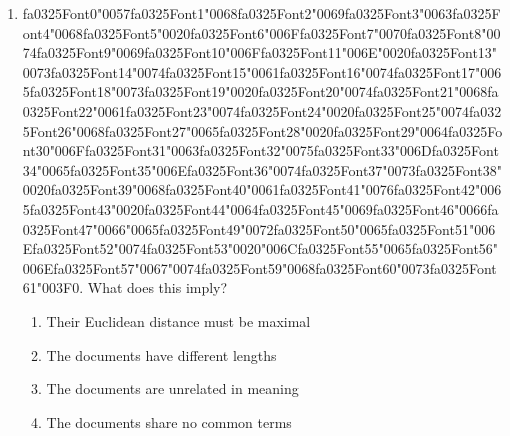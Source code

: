 \documentclass[12pt]{article}
\begin{document}
\begin{enumerate}[label=Q\arabic*.]
 \item {\csname fa0325Font0\endcsname\char"0057}{\csname fa0325Font1\endcsname\char"0068}{\csname fa0325Font2\endcsname\char"0069}{\csname fa0325Font3\endcsname\char"0063}{\csname fa0325Font4\endcsname\char"0068}{\csname fa0325Font5\endcsname\char"0020}{\csname fa0325Font6\endcsname\char"006F}{\csname fa0325Font7\endcsname\char"0070}{\csname fa0325Font8\endcsname\char"0074}{\csname fa0325Font9\endcsname\char"0069}{\csname fa0325Font10\endcsname\char"006F}{\csname fa0325Font11\endcsname\char"006E}{\char"0020}{\csname fa0325Font13\endcsname\char"0073}{\csname fa0325Font14\endcsname\char"0074}{\csname fa0325Font15\endcsname\char"0061}{\csname fa0325Font16\endcsname\char"0074}{\csname fa0325Font17\endcsname\char"0065}{\csname fa0325Font18\endcsname\char"0073}{\csname fa0325Font19\endcsname\char"0020}{\csname fa0325Font20\endcsname\char"0074}{\csname fa0325Font21\endcsname\char"0068}{\csname fa0325Font22\endcsname\char"0061}{\csname fa0325Font23\endcsname\char"0074}{\csname fa0325Font24\endcsname\char"0020}{\csname fa0325Font25\endcsname\char"0074}{\csname fa0325Font26\endcsname\char"0068}{\csname fa0325Font27\endcsname\char"0065}{\csname fa0325Font28\endcsname\char"0020}{\csname fa0325Font29\endcsname\char"0064}{\csname fa0325Font30\endcsname\char"006F}{\csname fa0325Font31\endcsname\char"0063}{\csname fa0325Font32\endcsname\char"0075}{\csname fa0325Font33\endcsname\char"006D}{\csname fa0325Font34\endcsname\char"0065}{\csname fa0325Font35\endcsname\char"006E}{\csname fa0325Font36\endcsname\char"0074}{\csname fa0325Font37\endcsname\char"0073}{\csname fa0325Font38\endcsname\char"0020}{\csname fa0325Font39\endcsname\char"0068}{\csname fa0325Font40\endcsname\char"0061}{\csname fa0325Font41\endcsname\char"0076}{\csname fa0325Font42\endcsname\char"0065}{\csname fa0325Font43\endcsname\char"0020}{\csname fa0325Font44\endcsname\char"0064}{\csname fa0325Font45\endcsname\char"0069}{\csname fa0325Font46\endcsname\char"0066}{\csname fa0325Font47\endcsname\char"0066}{\char"0065}{\csname fa0325Font49\endcsname\char"0072}{\csname fa0325Font50\endcsname\char"0065}{\csname fa0325Font51\endcsname\char"006E}{\csname fa0325Font52\endcsname\char"0074}{\csname fa0325Font53\endcsname\char"0020}{\char"006C}{\csname fa0325Font55\endcsname\char"0065}{\csname fa0325Font56\endcsname\char"006E}{\csname fa0325Font57\endcsname\char"0067}{\char"0074}{\csname fa0325Font59\endcsname\char"0068}{\csname fa0325Font60\endcsname\char"0073}{\csname fa0325Font61\endcsname\char"003F}$0$. What does this imply?
 \begin{enumerate}[label=(\Alph*)]
     \item Their Euclidean distance must be maximal
     \item The documents have different lengths
     \item The documents are unrelated in meaning
     \item The documents share no common terms
 \end{enumerate}
 

\end{enumerate}
\end{document}
